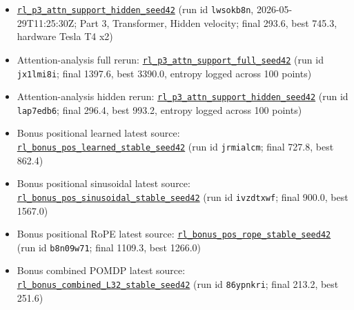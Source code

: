 \documentclass[11pt]{article}
\begin{document}
\begin{itemize}
\item \href{https://wandb.ai/krishsachdev246-bits-pilani/saidl-rl/runs/lwsokb8n}{\texttt{rl\_p3\_attn\_support\_hidden\_seed42}} (run id \texttt{lwsokb8n}, 2026-05-29T11:25:30Z; Part 3, Transformer, Hidden velocity; final 293.6, best 745.3, hardware Tesla T4 x2)
\item Attention-analysis full rerun: \href{https://wandb.ai/krishsachdev246-bits-pilani/saidl-rl/runs/jx1lmi8i}{\texttt{rl\_p3\_attn\_support\_full\_seed42}} (run id \texttt{jx1lmi8i}; final 1397.6, best 3390.0, entropy logged across 100 points)
\item Attention-analysis hidden rerun: \href{https://wandb.ai/krishsachdev246-bits-pilani/saidl-rl/runs/lap7edb6}{\texttt{rl\_p3\_attn\_support\_hidden\_seed42}} (run id \texttt{lap7edb6}; final 296.4, best 993.2, entropy logged across 100 points)
\item Bonus positional learned latest source: \href{https://wandb.ai/krishsachdev246-bits-pilani/saidl-rl/runs/jrmialcm}{\texttt{rl\_bonus\_pos\_learned\_stable\_seed42}} (run id \texttt{jrmialcm}; final 727.8, best 862.4)
\item Bonus positional sinusoidal latest source: \href{https://wandb.ai/krishsachdev246-bits-pilani/saidl-rl/runs/ivzdtxwf}{\texttt{rl\_bonus\_pos\_sinusoidal\_stable\_seed42}} (run id \texttt{ivzdtxwf}; final 900.0, best 1567.0)
\item Bonus positional RoPE latest source: \href{https://wandb.ai/krishsachdev246-bits-pilani/saidl-rl/runs/b8n09w71}{\texttt{rl\_bonus\_pos\_rope\_stable\_seed42}} (run id \texttt{b8n09w71}; final 1109.3, best 1266.0)
\item Bonus combined POMDP latest source: \href{https://wandb.ai/krishsachdev246-bits-pilani/saidl-rl/runs/86ypnkri}{\texttt{rl\_bonus\_combined\_L32\_stable\_seed42}} (run id \texttt{86ypnkri}; final 213.2, best 251.6)
\end{itemize}
\normalsize
\end{document}
